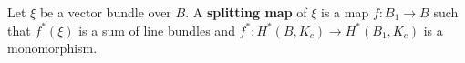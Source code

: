 Let $\xi$ be a vector bundle over $B$. A \textbf{splitting map} of $\xi$ is a map $f: B_1 \rightarrow B$ such that $f^*(\xi)$ is a sum of line bundles and $f^*: H^*(B, K_c) \rightarrow H^*(B_1, K_c)$ is a monomorphism.
